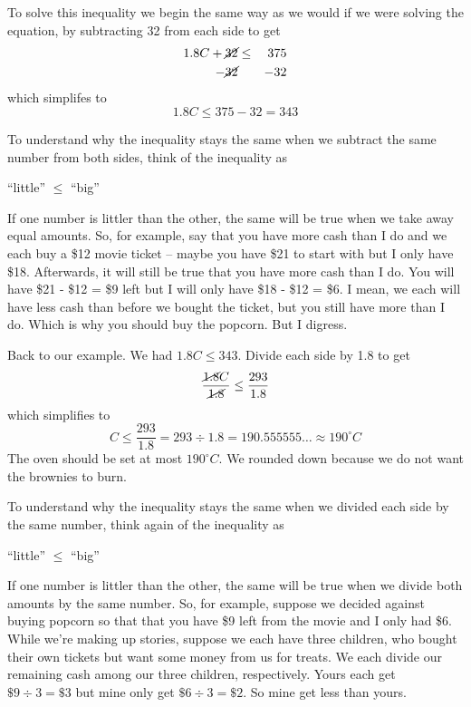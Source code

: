 To solve this inequality we begin the same way as we would if we were solving the equation, by subtracting 32 from each side to get
 \begin{eqnarray*}
1.8C + \cancel{32}& \le &375  \\
-\cancel{32}& & -32  \\
\end{eqnarray*}
which simplifes to $$1.8C\le375-32=343$$  

To understand why the inequality stays the same when we subtract the same number from both sides, think of the inequality as \begin{center} ``little'' $\le$ ``big'' \end{center}  If one number is littler than the other, the same will be true when we take away equal amounts.  So, for example, say that you have more cash than I do and we each buy a \$12 movie ticket -- maybe you have \$21 to start with but I only have \$18.  Afterwards, it will still be true that you have more cash than I do. You will have \$21 - \$12 = \$9 left but I will only have \$18 - \$12 = \$6.  I mean, we each will have less cash than before we bought the ticket, but you still have more than I do.  Which is why you should buy the popcorn.  But I digress.  %

Back to our example.  We had  $1.8C\le343$. Divide each side by 1.8 to get
$$\frac{\cancel{1.8}C}{\cancel{1.8} }\le \frac{293}{1.8}$$
which simplifies to $$C\le \frac{293}{1.8}= 293 \div 1.8 = 190.555555\ldots \approx 190^\circ C$$
The oven should be set at most $190^\circ C$.  We rounded down because we do not want the brownies to burn.

To understand why the inequality stays the same when we divided each side by the same number, think again of the inequality as \begin{center} ``little'' $\le$ ``big'' \end{center}  If one number is littler than the other, the same will be true when we divide both amounts by the same number.  So, for example, suppose we decided against buying popcorn so that  that you have \$9 left from the movie and I only had \$6. While we're making up stories, suppose we each have three children, who bought their own tickets but want some money from us for treats.  We each divide our remaining cash among our three children, respectively.  Yours each get $\$9\div 3 = \$3$ but mine only get $\$6\div3 =\$2$.  So mine get less than yours.

